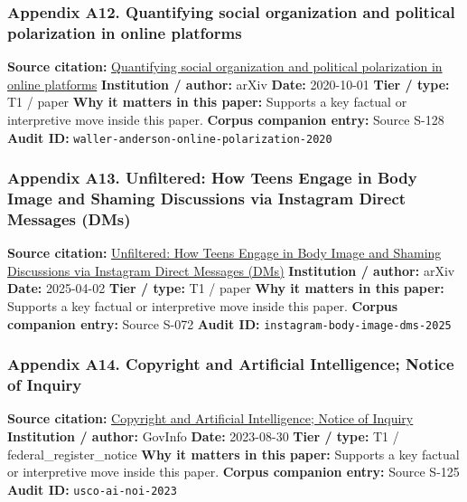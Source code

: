 \documentclass[
  american,
  11pt,
  letterpaper,
]{article}
\begin{document}
\subsubsection{Appendix A12. Quantifying social organization and
political polarization in online
platforms}\label{appendix-a12-quantifying-social-organization-and-political-polarization-in-online-platforms}

\textbf{Source citation:}
\href{https://arxiv.org/abs/2010.00590}{Quantifying social organization
and political polarization in online platforms} \textbf{Institution /
author:} arXiv \textbf{Date:} 2020-10-01 \textbf{Tier / type:} T1 /
paper \textbf{Why it matters in this paper:} Supports a key factual or
interpretive move inside this paper. \textbf{Corpus companion entry:}
Source S-128 \textbf{Audit ID:}
\texttt{waller-anderson-online-polarization-2020}

\subsubsection{Appendix A13. Unfiltered: How Teens Engage in Body Image
and Shaming Discussions via Instagram Direct Messages
(DMs)}\label{appendix-a13-unfiltered-how-teens-engage-in-body-image-and-shaming-discussions-via-instagram-direct-messages-dms}

\textbf{Source citation:}
\href{https://arxiv.org/abs/2504.02176}{Unfiltered: How Teens Engage in
Body Image and Shaming Discussions via Instagram Direct Messages (DMs)}
\textbf{Institution / author:} arXiv \textbf{Date:} 2025-04-02
\textbf{Tier / type:} T1 / paper \textbf{Why it matters in this paper:}
Supports a key factual or interpretive move inside this paper.
\textbf{Corpus companion entry:} Source S-072 \textbf{Audit ID:}
\texttt{instagram-body-image-dms-2025}

\subsubsection{Appendix A14. Copyright and Artificial Intelligence;
Notice of
Inquiry}\label{appendix-a14-copyright-and-artificial-intelligence-notice-of-inquiry}

\textbf{Source citation:}
\href{https://www.govinfo.gov/content/pkg/FR-2023-08-30/pdf/2023-18624.pdf}{Copyright
and Artificial Intelligence; Notice of Inquiry} \textbf{Institution /
author:} GovInfo \textbf{Date:} 2023-08-30 \textbf{Tier / type:} T1 /
federal\_register\_notice \textbf{Why it matters in this paper:}
Supports a key factual or interpretive move inside this paper.
\textbf{Corpus companion entry:} Source S-125 \textbf{Audit ID:}
\texttt{usco-ai-noi-2023}
\end{document}

